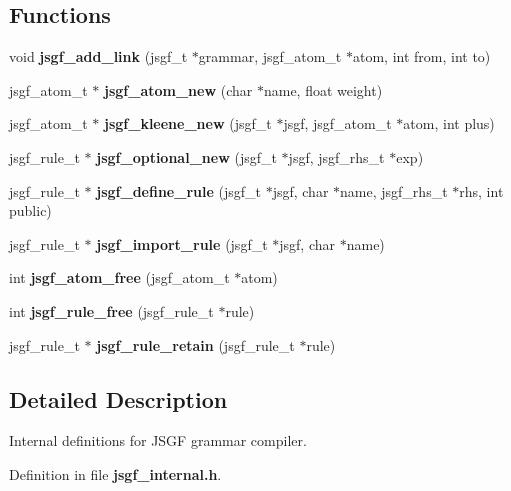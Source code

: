 \subsection*{Functions}
\begin{CompactItemize}
\item 
void \textbf{jsgf\_\-add\_\-link} (jsgf\_\-t $\ast$grammar, jsgf\_\-atom\_\-t $\ast$atom, int from, int to)\label{jsgf__internal_8h_cb5af4a04abc56a8584eba9b937f8154}

\item 
jsgf\_\-atom\_\-t $\ast$ \textbf{jsgf\_\-atom\_\-new} (char $\ast$name, float weight)\label{jsgf__internal_8h_0e59b63784fa8761358bb2bdf568bec1}

\item 
jsgf\_\-atom\_\-t $\ast$ \textbf{jsgf\_\-kleene\_\-new} (jsgf\_\-t $\ast$jsgf, jsgf\_\-atom\_\-t $\ast$atom, int plus)\label{jsgf__internal_8h_b9dc2ab39224cda76c43822150cf7e67}

\item 
jsgf\_\-rule\_\-t $\ast$ \textbf{jsgf\_\-optional\_\-new} (jsgf\_\-t $\ast$jsgf, jsgf\_\-rhs\_\-t $\ast$exp)\label{jsgf__internal_8h_4a07cb0721add8783f0ea24dfacd6c0f}

\item 
jsgf\_\-rule\_\-t $\ast$ \textbf{jsgf\_\-define\_\-rule} (jsgf\_\-t $\ast$jsgf, char $\ast$name, jsgf\_\-rhs\_\-t $\ast$rhs, int public)\label{jsgf__internal_8h_91539f6bf30f85af4b90b5a85598f53f}

\item 
jsgf\_\-rule\_\-t $\ast$ \textbf{jsgf\_\-import\_\-rule} (jsgf\_\-t $\ast$jsgf, char $\ast$name)\label{jsgf__internal_8h_fe1e47584e4dd80929552ffed77373f2}

\item 
int \textbf{jsgf\_\-atom\_\-free} (jsgf\_\-atom\_\-t $\ast$atom)\label{jsgf__internal_8h_289d683bf62d1a5aaac6917fa64f54f2}

\item 
int \textbf{jsgf\_\-rule\_\-free} (jsgf\_\-rule\_\-t $\ast$rule)\label{jsgf__internal_8h_f2faf6fb74ad1e4d43cf990c1bcec672}

\item 
jsgf\_\-rule\_\-t $\ast$ \textbf{jsgf\_\-rule\_\-retain} (jsgf\_\-rule\_\-t $\ast$rule)\label{jsgf__internal_8h_d152a23eb0f0d9af8417919fc93074fd}

\end{CompactItemize}


\subsection{Detailed Description}
Internal definitions for JSGF grammar compiler. 



Definition in file {\bf jsgf\_\-internal.h}.